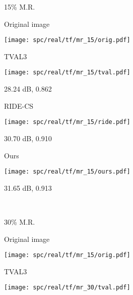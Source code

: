 \documentclass[journal,twoside]{IEEEtran}
\begin{document}
\begin{figure*}[!t]
\begin{minipage}{.001\textwidth}
\raggedleft
\begin{turn}{90} 15\% M.R. \end{turn}
\end{minipage}
\begin{minipage}{.999\textwidth}
\centering
\begin{minipage}{.20\textwidth}
\centerline{Original image}
\vspace{0.01cm}
\texttt{[image: spc/real/tf/mr\_15/orig.pdf]}  
\centerline{}
\end{minipage}\hspace{0.1cm}
\begin{minipage}{.20\textwidth}
\centerline{TVAL3}
\vspace{0.1cm}
\texttt{[image: spc/real/tf/mr\_15/tval.pdf]}  
  
\centerline{28.24 dB, 0.862}
\end{minipage}\hspace{0.1cm}
\begin{minipage}{.20\textwidth}
\centerline{RIDE-CS}
\vspace{0.1cm}
\texttt{[image: spc/real/tf/mr\_15/ride.pdf]}  
  
\centerline{30.70 dB, 0.910}
\end{minipage}\hspace{0.1cm}
\begin{minipage}{.20\textwidth}
\centerline{Ours}
\vspace{0.1cm}
\texttt{[image: spc/real/tf/mr\_15/ours.pdf]}  
\centerline{31.65 dB, 0.913}
\end{minipage}\\

\end{minipage}

\centerline{}
\centerline{}

\begin{minipage}{.001\textwidth}
\raggedleft
\begin{turn}{90} 30\% M.R. \end{turn}
\end{minipage}
\begin{minipage}{.999\textwidth}
\centering
\begin{minipage}{.20\textwidth}
\centerline{Original image}
\vspace{0.01cm}
\texttt{[image: spc/real/tf/mr\_15/orig.pdf]}  
\centerline{}
\end{minipage}\hspace{0.1cm}
\begin{minipage}{.20\textwidth}
\centerline{TVAL3}
\vspace{0.1cm}
\texttt{[image: spc/real/tf/mr\_30/tval.pdf]}  
  

\end{minipage}
\end{minipage}
\end{figure*}
\end{document}
